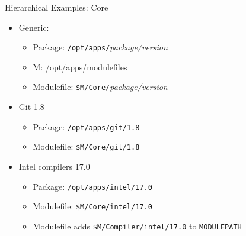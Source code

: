 \documentclass{beamer}
\begin{document}
\begin{frame}{Hierarchical Examples: Core}
  \begin{itemize}
    \item Generic:
      \begin{itemize}
        \item Package: \texttt{/opt/apps/}\emph{package/version}
        \item M: {\color{blue}/opt/apps/modulefiles}
        \item Modulefile: \texttt{{\color{blue}\$M}/Core/}\emph{package/version}
      \end{itemize}
    \item Git 1.8
      \begin{itemize}
        \item Package: \texttt{/opt/apps/git/1.8}
        \item Modulefile: \texttt{{\color{blue}\$M}/Core/git/1.8}
      \end{itemize}
    \item Intel compilers 17.0
      \begin{itemize}
        \item Package: \texttt{/opt/apps/intel/17.0}
        \item Modulefile: \texttt{{\color{blue}\$M}/Core/intel/17.0}
        \item Modulefile adds \texttt{{\color{blue}\$M}/Compiler/intel/17.0} to \texttt{MODULEPATH}
      \end{itemize}
  \end{itemize}
\end{frame}
\end{document}
